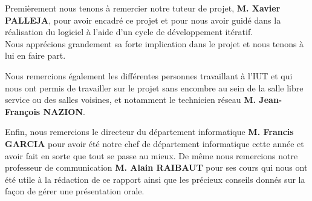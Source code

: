 


Premièrement nous tenons à remercier notre tuteur de projet, \textbf{M. Xavier PALLEJA}, pour avoir encadré ce projet et pour nous avoir guidé dans la réalisation du logiciel à l'aide d'un cycle de développement itératif.
\\
Nous apprécions grandement sa forte implication dans le projet et nous tenons à lui en faire part.

\bigbreak

Nous remercions également les différentes personnes travaillant à l'IUT et qui nous ont permis de travailler sur le projet sans encombre au sein de la salle libre service ou des salles voisines, et notamment le technicien réseau \textbf{M. Jean-François NAZION}.

\bigbreak
Enfin, nous remercions le directeur du département informatique \textbf{M. Francis GARCIA} pour avoir été notre chef de département informatique cette année et avoir fait en sorte que tout se passe au mieux. De même nous remercions notre professeur de communication \textbf{M. Alain RAIBAUT} pour ses cours qui nous ont été utile à la rédaction de ce rapport ainsi que les précieux conseils donnés sur la façon de gérer une présentation orale.